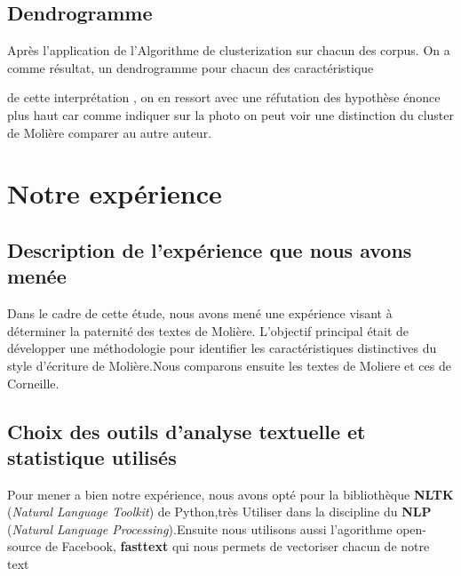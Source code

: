 \documentclass[]{report}
\begin{document}
\subsection{ Dendrogramme }
Après l'application de l'Algorithme de clusterization sur chacun des corpus. On a comme résultat, un dendrogramme pour chacun des caractéristique   

\begin{center}
\end{center}
 \vspace{\baselineskip}
 \hspace{0,5cm}  de cette interprétation , on en ressort avec une réfutation des hypothèse énonce plus haut car comme indiquer sur la photo on peut voir une distinction du cluster de Molière comparer au autre auteur.
\section{Notre expérience}

\vspace{\baselineskip}
\subsection{Description de l'expérience que nous avons menée}
\vspace{\baselineskip}
\hspace{0,5cm}Dans le cadre de cette étude, nous avons mené une expérience visant à déterminer
la paternité des textes de Molière. L'objectif principal était de développer une
méthodologie pour identifier les caractéristiques distinctives du style
d'écriture de Molière.Nous comparons ensuite les textes de Moliere et ces de Corneille.

\subsection{Choix des outils d'analyse textuelle et statistique utilisés}
\vspace{\baselineskip}
\hspace{0,5cm} Pour mener a bien notre expérience, nous avons opté pour la bibliothèque  \textbf{NLTK} (\textit{Natural Language Toolkit}) de Python,très Utiliser dans la discipline du \textbf{NLP} (\textit{Natural Language Processing}).Ensuite nous utilisons aussi l'agorithme open-source de Facebook, \textbf{fasttext} qui nous permets de vectoriser chacun de notre text
\end{document}
